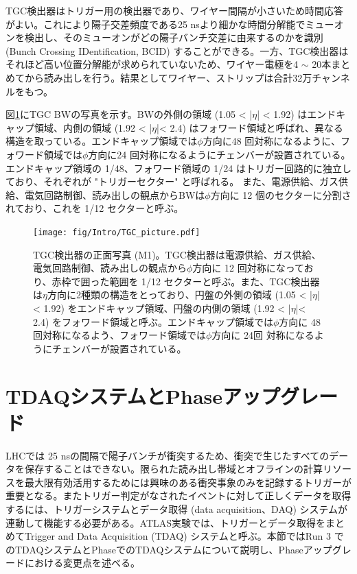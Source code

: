 TGC検出器はトリガー用の検出器であり、ワイヤー間隔が小さいため時間応答がよい。これにより陽子交差頻度である25 nsより細かな時間分解能でミューオンを検出し、そのミューオンがどの陽子バンチ交差に由来するのかを識別 (Bunch Crossing IDentification, BCID) することができる。一方、TGC検出器はそれほど高い位置分解能が求められていないため、ワイヤー電極を4 $\sim$ 20本まとめてから読み出しを行う。結果としてワイヤー、ストリップは合計32万チャンネルをもつ。

図\ref{TGC_picture}にTGC BWの写真を示す。BWの外側の領域 (1.05 < |$\eta$| < 1.92) はエンドキャップ領域、内側の領域  (1.92 < |$\eta$|< 2.4) はフォワード領域と呼ばれ、異なる構造を取っている。エンドキャップ領域では$\phi$方向に48 回対称になるように、フォワード領域では$\phi$方向に24 回対称になるようにチェンバーが設置されている。エンドキャップ領域の 1/48、フォワード領域の 1/24 はトリガー回路的に独立しており、それぞれが "トリガーセクター" と呼ばれる。
また、電源供給、ガス供給、電気回路制御、読み出しの観点からBWは$\phi$方向に 12 個のセクターに分割されており、これを 1/12 セクターと呼ぶ。
\begin{figure} 
    \centering
    \texttt{[image: fig/Intro/TGC\_picture.pdf]}
    \caption[TGC検出器]{TGC検出器の正面写真 (M1)\cite{cern_document_server}。TGC検出器は電源供給、ガス供給、電気回路制御、読み出しの観点から$\phi$方向に 12 回対称になっており、赤枠で囲った範囲を 1/12 セクターと呼ぶ。また、TGC検出器は$\eta$方向に2種類の構造をとっており、円盤の外側の領域  (1.05 < |$\eta$| < 1.92) をエンドキャップ領域、円盤の内側の領域  (1.92 < |$\eta$|< 2.4) をフォワード領域と呼ぶ。エンドキャップ領域では$\phi$方向に 48 回対称になるよう、フォワード領域では$\phi$方向に 24回 対称になるようにチェンバーが設置されている。}
    \label{TGC_picture}
\end{figure}



\section{TDAQシステムとPhase\two アップグレード}
\label{sec_TDAQ}
    LHCでは 25 nsの間隔で陽子バンチが衝突するため、衝突で生じたすべてのデータを保存することはできない。限られた読み出し帯域とオフラインの計算リソースを最大限有効活用するためには興味のある衝突事象のみを記録するトリガーが重要となる。またトリガー判定がなされたイベントに対して正しくデータを取得するには、トリガーシステムとデータ取得 (data acquisition、DAQ) システムが連動して機能する必要がある。ATLAS実験では、トリガーとデータ取得をまとめてTrigger and Data Acquisition (TDAQ) システムと呼ぶ。本節ではRun 3 でのTDAQシステムとPhase\two でのTDAQシステムについて説明し、Phase\two アップグレードにおける変更点を述べる。
   
